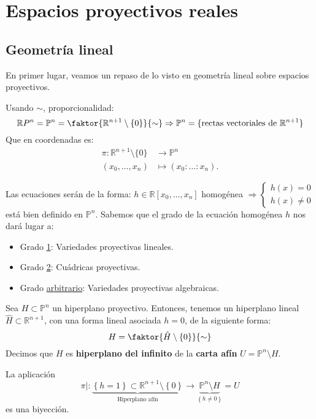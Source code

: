 \section{Espacios proyectivos reales}%
\label{sec:espacios_proyectivos_reales}
\subsection{Geometría lineal}
\label{sub:geometría_lineal}
En primer lugar, veamos un repaso de lo visto en geometría lineal sobre espacios proyectivos.
\begin{defi}    
Usando $\sim$, proporcionalidad: 
\[
\mathbb{R}P^n = \mathbb{P}^{n} = \faktor{\mathbb{R}^{n+1}\setminus \{0\}}{\sim} \Rightarrow \mathbb{P}^{n} = \{\text{rectas vectoriales de } \mathbb{R}^{n+1}\}     
\]
Que en coordenadas es:
\begin{align*}
    \pi: \mathbb{R}^{n+1} \setminus \{0\} &\rightarrow \mathbb{P}^{n}\\
    \left( x_0, \ldots, x_n \right) &\mapsto \left( x_0 : \ldots : x_n \right) 
.\end{align*}
\end{defi}
\begin{obs}
Las ecuaciones serán de la forma: $h\in \mathbb{R}\left[ x_0, \ldots, x_n \right]$ homogénea $\Rightarrow \begin{cases}
    h\left( x \right) = 0\\
    h\left( x \right) \neq 0
\end{cases}$ está bien definido en $\mathbb{P}^{n}$.
Sabemos que el grado de la ecuación homogénea $h$ nos dará lugar a:
\begin{itemize}
    \item Grado \underline{1}: Variedades proyectivas lineales.
    \item Grado \underline{2}: Cuádricas proyectivas.
    \item Grado \underline{arbitrario}: Variedades proyectivas algebraicas.
\end{itemize}
\end{obs}

\begin{defi}
Sea $H \subset \mathbb{P}^n$ un hiperplano proyectivo. Entonces, tenemos un hiperplano lineal $\hat{H} \subset \mathbb{R}^{n+1}$, con una forma lineal asociada $h = 0$, de la siguiente forma:
\[
H = \faktor{\hat{H}\setminus \left\{ 0 \right\}}{\sim}
\]
Decimos que $H$ es \textbf{hiperplano del infinito} de la \textbf{carta afín} $U = \mathbb{P}^n \setminus H$.
\end{defi}
\begin{prop}
La aplicación 
\[
\pi|: \underbrace{\left\{ h = 1 \right\}\subset \mathbb{R}^{n+1} \setminus \left\{ 0 \right\}}_{\text{Hiperplano afín}} \rightarrow \underbrace{\mathbb{P}^{n} \setminus H}_{\left\{ h \neq 0 \right\}} = U
\]
es una biyección.
\end{prop}

